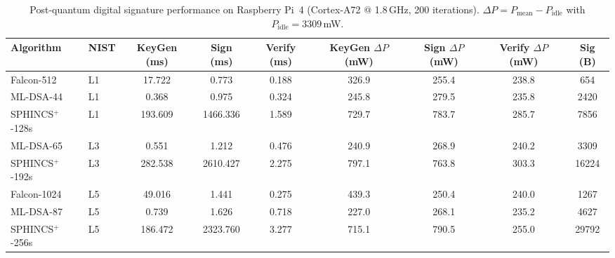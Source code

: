 \documentclass[10pt,twocolumn]{article}
\begin{document}
\begin{table}[!ht]
\centering
\caption{Post-quantum digital signature performance on Raspberry Pi~4 (Cortex-A72 @ 1.8\,GHz, 200 iterations).
$\Delta P = P_\text{mean} - P_\text{idle}$ with $P_\text{idle} = 3309$\,mW.}
\label{tab:sig-primitives}
\footnotesize
\setlength{\tabcolsep}{3.5pt}
\begin{tabular}{@{}llS[table-format=3.3]S[table-format=4.3]S[table-format=1.3]S[table-format=3.1]S[table-format=3.1]S[table-format=3.1]S[table-format=5.0]@{}}
\toprule
{Algorithm} & {NIST} & {KeyGen (ms)} & {Sign (ms)} & {Verify (ms)} & {KeyGen $\Delta P$ (mW)} & {Sign $\Delta P$ (mW)} & {Verify $\Delta P$ (mW)} & {Sig (B)} \\
\midrule
Falcon-512           & L1 &  17.722 &    0.773 & 0.188 & 326.9 & 255.4 & 238.8 &   654 \\
ML-DSA-44            & L1 &   0.368 &    0.975 & 0.324 & 245.8 & 279.5 & 235.8 &  2420 \\
SPHINCS$^+$-128s     & L1 & 193.609 & 1466.336 & 1.589 & 729.7 & 783.7 & 285.7 &  7856 \\
\midrule
ML-DSA-65            & L3 &   0.551 &    1.212 & 0.476 & 240.9 & 268.9 & 240.2 &  3309 \\
SPHINCS$^+$-192s     & L3 & 282.538 & 2610.427 & 2.275 & 797.1 & 763.8 & 303.3 & 16224 \\
\midrule
Falcon-1024          & L5 &  49.016 &    1.441 & 0.275 & 439.3 & 250.4 & 240.0 &  1267 \\
ML-DSA-87            & L5 &   0.739 &    1.626 & 0.718 & 227.0 & 268.1 & 235.2 &  4627 \\
SPHINCS$^+$-256s     & L5 & 186.472 & 2323.760 & 3.277 & 715.1 & 790.5 & 255.0 & 29792 \\
\bottomrule
\end{tabular}
\end{table}
\end{document}
